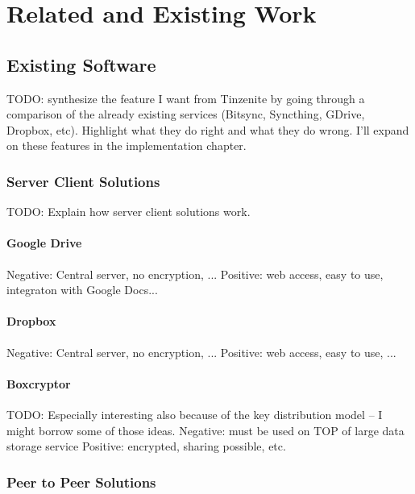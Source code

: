 \chapter{Related and Existing Work}
\label{chap:related}


\section{Existing Software}

TODO: synthesize the feature I want from Tinzenite by going through a comparison of the already existing services (Bitsync, Syncthing, GDrive, Dropbox, etc).
Highlight what they do right and what they do wrong.
I'll expand on these features in the implementation chapter.

\subsection{Server Client Solutions}

TODO: Explain how server client solutions work.

\subsubsection{Google Drive}

Negative: Central server, no encryption, ...
Positive: web access, easy to use, integraton with Google Docs...

\subsubsection{Dropbox}

Negative: Central server, no encryption, ...
Positive: web access, easy to use, ...

\subsubsection{Boxcryptor}

TODO: Especially interesting also because of the key distribution model – I might borrow some of those ideas.
Negative: must be used on TOP of large data storage service
Positive: encrypted, sharing possible, etc.

\subsection{Peer to Peer Solutions}

